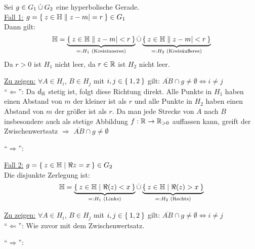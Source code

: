 \documentclass[a5paper,oneside]{scrbook}
\begin{document}
\begin{beweis}\leavevmode
 Sei $g \in G_1 \mathbin{\dot{\cup}} G_2$ eine hyperbolische Gerade.\\
              \underline{Fall 1:} $g = \Set{z \in \ensuremath{\mathbb{H}}| |z-m| = r} \in G_1$\\
              Dann gilt:
              \[\mathbb{H} = \underbrace{\Set{z \in \ensuremath{\mathbb{H}}| |z-m| < r}}_{=:H_1 \text{ (Kreisinneres)}} \mathbin{\dot{\cup}} \underbrace{\Set{z \in \ensuremath{\mathbb{H}}| |z-m| < r}}_{=:H_2 \text{ (Kreisäußeres)}}\]
              Da $r > 0$ ist $H_1$ nicht leer, da $r \in \mathbb{R}$ ist $H_2$ nicht leer.

              \underline{Zu zeigen:} $\forall A \in H_i$, $B \in H_j$ mit
                      $i,j \in \Set{1,2}$ gilt: 
                      $\overline{AB} \cap g \neq \emptyset \Leftrightarrow i \neq j$\\
              \enquote{$\Leftarrow$}: Da $d_{\mathbb{H}}$ stetig ist, folgt diese Richtung
              direkt. Alle Punkte in $H_1$ haben einen Abstand von $m$ der kleiner
              ist als $r$ und alle Punkte in $H_2$ haben einen Abstand von $m$ der
              größer ist als $r$. Da man jede Strecke von $A$ nach $B$ insbesondere
              auch als stetige Abbildung $f: \mathbb{R} \rightarrow \mathbb{R}_{>0}$ auffassen
              kann, greift der Zwischenwertsatz $\Rightarrow$ $\overline{AB} \cap g \neq \emptyset$

              \enquote{$\Rightarrow$}:

              \underline{Fall 2:} $g = \Set{z \in \ensuremath{\mathbb{H}}| \Re{z} = x} \in G_2$\\
              Die disjunkte Zerlegung ist:
              \[\mathbb{H} = \underbrace{\Set{z \in \ensuremath{\mathbb{H}}| \Re(z) < x}}_{=: H_1 \text{ (Links)}} \mathbin{\dot{\cup}} \underbrace{\Set{z \in \ensuremath{\mathbb{H}}| \Re(z) > x}}_{=: H_2 \text{ (Rechts)}}\]

              \underline{Zu zeigen:} $\forall A \in H_i$, $B \in H_j$ mit
                      $i,j \in \Set{1,2}$ gilt: 
                      $\overline{AB} \cap g \neq \emptyset \Leftrightarrow i \neq j$\\
              \enquote{$\Leftarrow$}: Wie zuvor mit dem Zwischenwertsatz.

              \enquote{$\Rightarrow$}:
\end{beweis}
\end{document}
